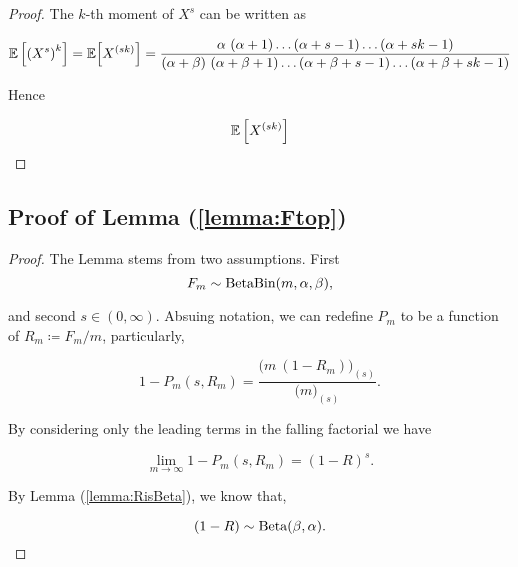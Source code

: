 \documentclass[../../main.tex]{subfiles}
\begin{document}
\begin{proof}
    The $k$-th moment of $X^s$ can be written as

    \begin{equation}
        \mathbb{E}\left[\left(X^s\right)^k\right] = \mathbb{E}\Big[X^{(sk)}\Big] = \frac{\alpha \ (\alpha + 1) \ldots (\alpha + s - 1) \ldots (\alpha + s k - 1) }{(\alpha + \beta) \ (\alpha + \beta + 1) \ldots (\alpha + \beta + s - 1) \ldots (\alpha + \beta + s k - 1) }
    \end{equation}

    Hence

    \begin{equation}
        \mathbb{E}\left[X^{(sk)}\right]
    \end{equation}

\end{proof}



\subsection[From distribution to probability]{Proof of Lemma (\ref{lemma:Ftop})}


\begin{proof}
    The Lemma stems from two assumptions. First
    \begin{equation}
        F_m \sim \text{Beta}\text{Bin}(m, \alpha, \beta),
    \end{equation}

    and second $s \in (0, \infty)$. Absuing notation, we can redefine $P_m$ to be a function of $R_m \coloneqq F_m / m$, particularly,
    
    \begin{equation}
        1 - P_m(s, R_m) = \frac{\big(m \ (1 - R_m)\big)_{(s)}}{\big( m \big)_{(s)}}.
    \end{equation}

    By considering only the leading terms in the falling factorial we have

    \begin{equation}
        \lim_{m \rightarrow \infty} 1 - P_m(s, R_m) = (1 - R)^s.
    \end{equation}

    By Lemma (\ref{lemma:RisBeta}), we know that,

    \begin{equation}
        (1 - R) \sim \text{Beta}(\beta, \alpha).
    \end{equation}

\end{proof}
\end{document}
